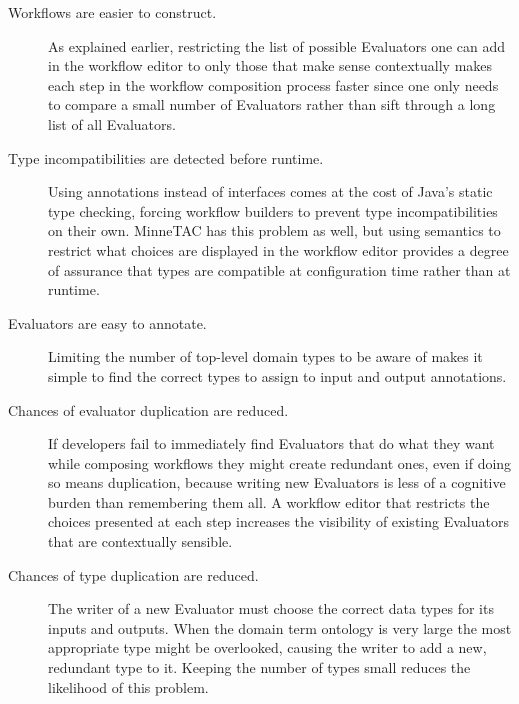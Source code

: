\documentclass{article}
\begin{document}
\begin{description}

\item[Workflows are easier to construct.]
As explained earlier, restricting the list of possible Evaluators one can add in the workflow editor to only those that make sense contextually makes each step in the workflow composition process faster since one only needs to compare a small number of Evaluators rather than sift through a long list of all Evaluators.

\item[Type incompatibilities are detected before runtime.]
Using annotations instead of interfaces comes at the cost of Java's static type checking, forcing workflow builders to prevent type incompatibilities on their own.
MinneTAC has this problem as well, but using semantics to restrict what choices are displayed in the workflow editor provides a degree of assurance that types are compatible at configuration time rather than at runtime.

\item[Evaluators are easy to annotate.]
Limiting the number of top-level domain types to be aware of makes it simple to find the correct types to assign to input and output annotations.

\item[Chances of evaluator duplication are reduced.]
If developers fail to immediately find Evaluators that do what they want while composing workflows they might create redundant ones, even if doing so means duplication, because writing new Evaluators is less of a cognitive burden than remembering them all.
A workflow editor that restricts the choices presented at each step increases the visibility of existing Evaluators that are contextually sensible.

\item[Chances of type duplication are reduced.]
The writer of a new Evaluator must choose the correct data types for its inputs and outputs.
When the domain term ontology is very large the most appropriate type might be overlooked, causing the writer to add a new, redundant type to it.
Keeping the number of types small reduces the likelihood of this problem.

\end{description}
\end{document}
